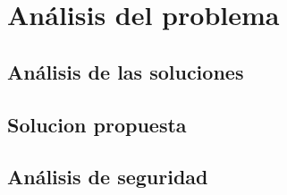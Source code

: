 \chapter{Análisis del problema}
 
\section{Análisis de las soluciones}

\section{Solucion propuesta}

\section{Análisis de seguridad}